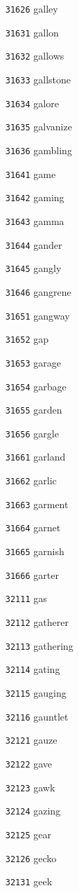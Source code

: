 \documentclass[twoside,11pt]{article}
\begin{document}
\begin{multicols}{5}
\begin{enumerate}
\item[\texttt{31626}] galley
\item[\texttt{31631}] gallon
\item[\texttt{31632}] gallows
\item[\texttt{31633}] gallstone
\item[\texttt{31634}] galore
\item[\texttt{31635}] galvanize
\item[\texttt{31636}] gambling
\item[\texttt{31641}] game
\item[\texttt{31642}] gaming
\item[\texttt{31643}] gamma
\item[\texttt{31644}] gander
\item[\texttt{31645}] gangly
\item[\texttt{31646}] gangrene
\item[\texttt{31651}] gangway
\item[\texttt{31652}] gap
\item[\texttt{31653}] garage
\item[\texttt{31654}] garbage
\item[\texttt{31655}] garden
\item[\texttt{31656}] gargle
\item[\texttt{31661}] garland
\item[\texttt{31662}] garlic
\item[\texttt{31663}] garment
\item[\texttt{31664}] garnet
\item[\texttt{31665}] garnish
\item[\texttt{31666}] garter
\item[\texttt{32111}] gas
\item[\texttt{32112}] gatherer
\item[\texttt{32113}] gathering
\item[\texttt{32114}] gating
\item[\texttt{32115}] gauging
\item[\texttt{32116}] gauntlet
\item[\texttt{32121}] gauze
\item[\texttt{32122}] gave
\item[\texttt{32123}] gawk
\item[\texttt{32124}] gazing
\item[\texttt{32125}] gear
\item[\texttt{32126}] gecko
\item[\texttt{32131}] geek

\end{enumerate}
\end{multicols}
\end{document}
